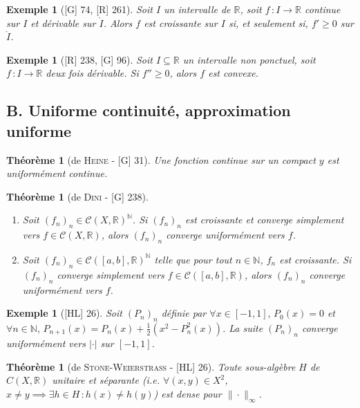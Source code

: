 \documentclass[10pt, a4paper, parskip=full, twoside, twocolumn]{report}
\newtheorem{theorem}[definition]{Théorème}
\newtheorem{example}[definition]{Exemple}
\newcommand{\IN}{\mathbb{N}}
\newcommand{\IR}{\mathbb{R}}
\begin{document}
\begin{example}[\textnormal{[G] 74, [R] 261}]
	Soit $I$ un intervalle de $\IR$, soit $f\,\colon I\to \IR$ continue sur $I$ et dérivable sur $\mathring{I}$. Alors $f$ est croissante sur $I$ si, et seulement si, $f'\geq 0$ sur $\mathring{I}$.
\end{example}

\begin{example}[\textnormal{[R] 238, [G] 96}]
	Soit $I\subseteq \IR$ un intervalle non ponctuel, soit $f\,\colon I\to\IR$ deux fois dérivable.
	Si $f''\geq 0$, alors $f$ est convexe.
\end{example}


\subsection*{B. Uniforme continuité, approximation uniforme}

\begin{theorem}[de \textsc{Heine} - \textnormal{[G] 31}]
	Une fonction continue sur un compact $y$ est uniformément continue.
\end{theorem}

\begin{theorem}[de \textsc{Dini} - \textnormal{[G] 238}]
	\begin{enumerate}
		\item Soit $\left(f_n\right)_{n}\in \mathcal{C}(X,\IR)^{\IN}$. Si $\left(f_n\right)_n$ est croissante et converge simplement vers $f\in\mathcal{C}(X,\IR)$, alors $\left(f_n\right)_n$ converge uniformément vers $f$.
		\item Soit $\left(f_n\right)_n\in\mathcal{C}([a,b],\IR)^{\IN}$ telle que pour tout $n\in\IN$, $f_n$ est croissante. Si $\left(f_n\right)_n$ converge simplement vers $f\in\mathcal{C}([a,b],\IR)$, alors $\left(f_n\right)_n$ converge uniformément vers $f$.
	\end{enumerate}
\end{theorem}

\begin{tcolorbox}[
    breakable, %
    colback=developpement, %
    colframe=gray!0!black, %
    boxrule=0pt, %
    arc=1mm, %
	boxsep=0pt,
	left=0pt, right=0pt, top=0pt, bottom=0pt
]
\begin{example}[\textnormal{[HL] 26}]
	\label{203dev11}
	Soit $\left(P_n\right)_n$ définie par $\forall x \in[-1,1],\, P_0(x)= 0$ et $\forall n\in \IN,\, P_{n+1}(x) = P_n(x) + \frac{1}{2}(x^2 - P_n^2(x))$.
	La suite $\left(P_n\right)_n$ converge uniformément vers $\vert\cdot\vert$ sur $[-1,1]$.
\end{example}
\begin{theorem}[de \textsc{Stone-Weierstrass} - \textnormal{[HL] 26}]
	\label{203dev12}
	Toute sous-algèbre $H$ de $C(X,\IR)$ unitaire et séparante (\emph{i.e.} $\forall (x,y)\in X^2$, $x\neq y\implies \exists h\in H\,\colon h(x)\neq h(y)$)
	est dense pour $\|\cdot\|_{\infty}$.
\end{theorem}
\end{tcolorbox}
\end{document}
